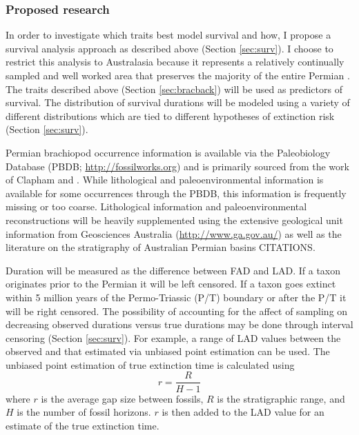 \documentclass[12pt,letterpaper]{article}
\begin{document}
\subsubsection{Proposed research} \label{sec:bracsurvmeth}
In order to investigate which traits best model survival and how, I propose a survival analysis approach as described above (Section \ref{sec:surv}). I choose to restrict this analysis to Australasia because it represents a relatively continually sampled and well worked area that preserves the majority of the entire Permian \citep{Fielding2008,Birgenheier2010,Clapham2012,Clapham2008a,Waterhouse1987,Archbold1995}. The traits described above (Section \ref{sec:bracback}) will be used as predictors of survival. The distribution of survival durations will be modeled using a variety of different distributions which are tied to different hypotheses of extinction risk (Section \ref{sec:surv}).

Permian brachiopod occurrence information is available via the Paleobiology Database (PBDB; \url{http://fossilworks.org}) and is primarily sourced from the work of Clapham \citep{Clapham2006,Clapham2008a,Clapham2007a,Clapham2012,Clapham2007} and \citet{Waterhouse1987}. While lithological and paleoenvironmental information is available for some occurrences through the PBDB, this information is frequently missing or too coarse. Lithological information and paleoenvironmental reconstructions will be heavily supplemented using the extensive geological unit information from Geosciences Australia (\url{http://www.ga.gov.au/}) as well as the literature on the stratigraphy of Australian Permian basins CITATIONS.

Duration will be measured as the difference between FAD and LAD. If a taxon originates prior to the Permian it will be left censored. If a taxon goes extinct within 5 million years of the Permo-Triassic (P/T) boundary or after the P/T it will be right censored. The possibility of accounting for the affect of sampling on decreasing observed durations versus true durations may be done through interval censoring (Section \ref{sec:surv}). For example, a range of LAD values between the observed and that estimated via unbiased point estimation \citep{Strauss1989,Alvarez1983a} can be used. The unbiased point estimation of true extinction time is calculated using
\begin{equation}
  r = \frac{R}{H - 1}
  \label{eq:stratest}
\end{equation}
where \(r\) is the average gap size between fossils, \(R\) is the stratigraphic range, and \(H\) is the number of fossil horizons. \(r\) is then added to the LAD value for an estimate of the true extinction time.
\end{document}

